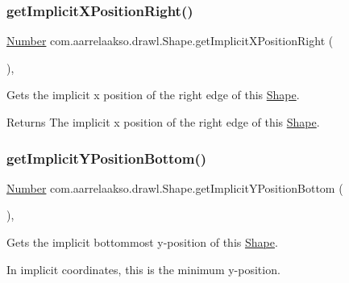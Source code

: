 \subsubsection{\texorpdfstring{get\+Implicit\+X\+Position\+Right()}{getImplicitXPositionRight()}}
{\footnotesize\ttfamily \hyperlink{interfacecom_1_1aarrelaakso_1_1drawl_1_1_number}{Number} com.\+aarrelaakso.\+drawl.\+Shape.\+get\+Implicit\+X\+Position\+Right (\begin{DoxyParamCaption}{ }\end{DoxyParamCaption})\hspace{0.3cm}{\ttfamily [protected]}, {\ttfamily [inherited]}}



Gets the implicit x position of the right edge of this \hyperlink{classcom_1_1aarrelaakso_1_1drawl_1_1_shape}{Shape}. 

\begin{DoxyReturn}{Returns}
The implicit x position of the right edge of this \hyperlink{classcom_1_1aarrelaakso_1_1drawl_1_1_shape}{Shape}. 
\end{DoxyReturn}
\mbox{\label{classcom_1_1aarrelaakso_1_1drawl_1_1_shape_a8d44b02976656bf4a81055a2dbae66cb}} 
\subsubsection{\texorpdfstring{get\+Implicit\+Y\+Position\+Bottom()}{getImplicitYPositionBottom()}}
{\footnotesize\ttfamily \hyperlink{interfacecom_1_1aarrelaakso_1_1drawl_1_1_number}{Number} com.\+aarrelaakso.\+drawl.\+Shape.\+get\+Implicit\+Y\+Position\+Bottom (\begin{DoxyParamCaption}{ }\end{DoxyParamCaption})\hspace{0.3cm}{\ttfamily [protected]}, {\ttfamily [inherited]}}



Gets the implicit bottommost y-\/position of this \hyperlink{classcom_1_1aarrelaakso_1_1drawl_1_1_shape}{Shape}. 

In implicit coordinates, this is the minimum y-\/position.

